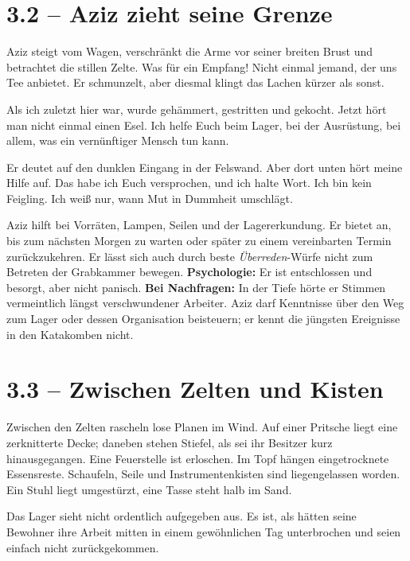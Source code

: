 \section{3.2 -- Aziz zieht seine Grenze}
\begin{vorlesetextalle}
Aziz steigt vom Wagen, verschränkt die Arme vor seiner breiten Brust und betrachtet die stillen Zelte. \glqq{}Was für ein Empfang! Nicht einmal jemand, der uns Tee anbietet.\grqq{} Er schmunzelt, aber diesmal klingt das Lachen kürzer als sonst.

\glqq{}Als ich zuletzt hier war, wurde gehämmert, gestritten und gekocht. Jetzt hört man nicht einmal einen Esel. Ich helfe Euch beim Lager, bei der Ausrüstung, bei allem, was ein vernünftiger Mensch tun kann.\grqq{}

Er deutet auf den dunklen Eingang in der Felswand. \glqq{}Aber dort unten hört meine Hilfe auf. Das habe ich Euch versprochen, und ich halte Wort. Ich bin kein Feigling. Ich wei\ss{} nur, wann Mut in Dummheit umschlägt.\grqq{}
\end{vorlesetextalle}
\begin{meisterinfo}
Aziz hilft bei Vorräten, Lampen, Seilen und der Lagererkundung. Er bietet an, bis zum nächsten Morgen zu warten oder später zu einem vereinbarten Termin zurückzukehren. Er lässt sich auch durch beste \emph{Überreden}-Würfe nicht zum Betreten der Grabkammer bewegen. \textbf{Psychologie:} Er ist entschlossen und besorgt, aber nicht panisch. \textbf{Bei Nachfragen:} In der Tiefe hörte er Stimmen vermeintlich längst verschwundener Arbeiter. Aziz darf Kenntnisse über den Weg zum Lager oder dessen Organisation beisteuern; er kennt die jüngsten Ereignisse in den Katakomben nicht.
\end{meisterinfo}
\section{3.3 -- Zwischen Zelten und Kisten}
\begin{vorlesetextalle}
Zwischen den Zelten rascheln lose Planen im Wind. Auf einer Pritsche liegt eine zerknitterte Decke; daneben stehen Stiefel, als sei ihr Besitzer kurz hinausgegangen. Eine Feuerstelle ist erloschen. Im Topf hängen eingetrocknete Essensreste. Schaufeln, Seile und Instrumentenkisten sind liegengelassen worden. Ein Stuhl liegt umgestürzt, eine Tasse steht halb im Sand.

Das Lager sieht nicht ordentlich aufgegeben aus. Es ist, als hätten seine Bewohner ihre Arbeit mitten in einem gewöhnlichen Tag unterbrochen und seien einfach nicht zurückgekommen.
\end{vorlesetextalle}
